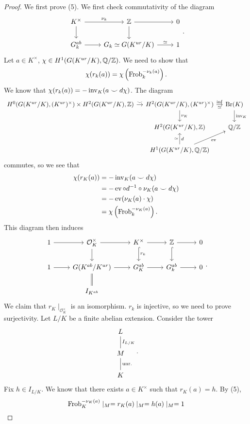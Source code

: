 \begin{proof}
	We first prove (5). We first check commutativity of the diagram
	\[
	\begin{tikzcd}
		K^{\times}\ar[r,"\nu_k"]\ar[d] & \ZZ\ar[r]\ar[d] & 0\\
		G_k^{ab}\ar[r] & G_k\simeq G(K^{ur}/K)\ar[r,"\simeq"] & 1
	\end{tikzcd}
	.\] 
	Let $a\in K^{\times}$, $\chi\in H^{1}(G(K^{ur}/K),\mathbb{Q}/\mathbb{Z})$. We need to show that
	\[
		\chi(r_k(a))=\chi\left(\operatorname{Frob}_k^{-\nu_k(a)}\right)
	.\] 
	We know that $\chi(r_k(a))=-\operatorname{inv}_K(a\smile d\chi)$. The diagram
	\[
		\begin{tikzcd}[column sep = 1em]
		H^{0}(G(K^{ur}/K),(K^{ur})^{\times})\times H^{2}(G(K^{ur}/K),\ZZ)\ar[r,"\smile"] & H^{2}(G(K^{ur}/K),(K^{ur})^{\times})\ar[r,"\inf","\simeq"']\ar[d,"\nu_K"] & \Br(K)\ar[d,"\inv_K"]\\
												 & H^{2}(G(K^{ur}/K),\ZZ) & \QQ/\ZZ\\
												 & H^{1}(G(K^{ur}/K),\QQ/\ZZ)\ar[ru,"\ev"']\ar[u,"d"',"\simeq"] & 
	\end{tikzcd}
	\] 
	commutes, so we see that 
	\begin{align*}
		\chi(r_K(a))&=-\operatorname{inv}_K(a\smile d\chi)\\
			    &=-\operatorname{ev}\circ d^{-1}\circ\nu_K(a\smile d\chi)\\
			    &=-\operatorname{ev}(\nu_K(a)\cdot\chi)\\
			    &=\chi\left(\operatorname{Frob}_k^{-\nu_K(a)}\right)
	.\end{align*}
	This diagram then induces
	\[
	\begin{tikzcd}
		1\ar[r]&\mathcal{O}_K^{\times}\ar[r]\ar[d]&K^{\times}\ar[r]\ar[d,hookrightarrow,"r_k"]&\ZZ\ar[r]\ar[d,hookrightarrow]&0\\
		1\ar[r]&G(K^{ab}/K^{ur})\ar[d,equals]\ar[r]&G_K^{ab}\ar[r]&G_k^{ab}\ar[r]&0\\
		       & I_{K^{ab}} & & &
	\end{tikzcd}
	.\] 
	We claim that $r_K\mid_{\mathcal{O}_K^{\times}}$ is an isomorphism. $r_k$ is injective, so we need to prove surjectivity. Let $L/K$ be a finite abelian extension. Consider the tower
	\[
	\begin{tikzcd}
		L\ar[d,-,"I_{L/K}"]\\
		M\ar[d,-,"\text{unr.}"]\\
		K
	\end{tikzcd}
	.\] 
	Fix $h\in I_{L/K}$. We know that there exists $a\in K^{\times}$ such that $r_K(a)=h$. By (5),
	\[
		\operatorname{Frob}_K^{-\nu_K(a)}\mid_M=r_K(a)\mid_M=h(a)\mid_M=1
\]
\end{proof}
